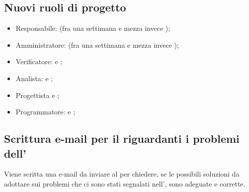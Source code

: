 \subsection{Nuovi ruoli di progetto}

\begin{itemize}
	\item Responsabile: \PF{} (fra una settimana e mezza invece \CE{});
	\item Amministratore: \CE{} (fra una settimana e mezza invece \PF{});
	\item Verificatore: \LD{} e \CE{};
	\item Analista: \AT{} e \DF{};
	\item Progettista \AT{} e \MC{};
	\item Programmatore: \BR{} e \SE{};
\end{itemize}

\subsection{Scrittura e-mail per il \CR{} riguardanti i problemi dell'\AdR{}}

Viene scritta una e-mail da inviare al \CR{} per chiedere, se le possibili soluzioni da adottare sui problemi che ci sono stati segnalati nell'\AdR{}, sono adeguate e corrette. 
